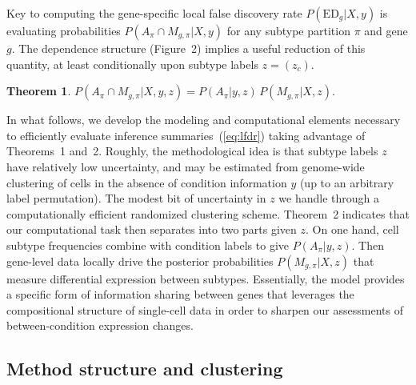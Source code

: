 \documentclass[aoas,preprint]{imsart}
\newtheorem{theorem}{Theorem}
\begin{document}
Key to computing the gene-specific 
local false discovery rate $P(\text{ED}_g|X,y)$ is
evaluating probabilities $P\left(A_\pi \cap M_{g,\pi} |X,y \right)$ for
any subtype partition $\pi$ and gene $g$.
The dependence structure (Figure~2) implies a useful reduction of this
quantity, at least conditionally upon subtype labels $z=(z_c)$.

\begin{theorem}  
$  P\left(A_\pi \cap M_{g,\pi} |X,y,z \right) 
  =  P\left(A_\pi |y,z \right) \, 
                      P\left(M_{g,\pi}| X,z \right).  $
\end{theorem}

In what follows, we develop the  modeling and computational elements necessary  to efficiently evaluate inference summaries~(\ref{eq:lfdr}) taking advantage of 
Theorems~1 and~2.  Roughly, the methodological idea is that subtype labels $z$
have relatively low uncertainty, and may be estimated from genome-wide 
clustering of cells in the absence of condition information $y$ (up to an arbitrary label permutation). 
The modest bit of uncertainty in $z$
we handle through a computationally efficient randomized clustering scheme.
 Theorem~2 indicates that our computational task then separates into
two parts given $z$.  On one hand, cell subtype frequencies 
combine with condition labels to give
$P\left(A_\pi |y,z \right)$. Then gene-level data
locally drive the posterior probabilities $P\left(M_{g,\pi}| X,z \right)$ that
measure differential expression between subtypes. 
Essentially, the model provides a specific form of information 
sharing between genes  that leverages the compositional structure of single-cell 
data in order to sharpen our assessments of between-condition expression changes. 


\subsection{Method structure and clustering}
\end{document}
